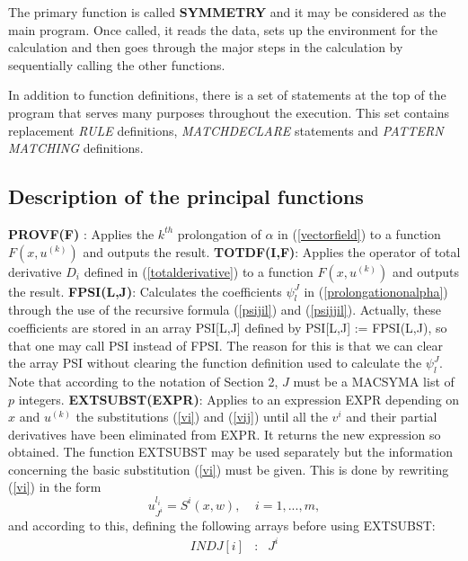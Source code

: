 {\nopagebreak
The primary function is called {\bf SYMMETRY} and it may be considered
as the main program. Once called, it reads the data, sets up the
environment for the calculation and then goes through the major steps
in the calculation by sequentially calling the other functions.

\nopagebreak
In addition to function definitions, there is a set of statements at the
top of the program that serves many purposes throughout the execution.
This set contains replacement {\em RULE} definitions, 
{\em MATCHDECLARE} statements
and {\em PATTERN MATCHING} definitions.

\pagebreak
\subsection{Description of the principal functions}
\vskip 1pt
{\bf PROVF(F) }: Applies the $k^{th}$ prolongation of $\alpha$ in
(\ref{vectorfield}) to a function $F(x, u^{(k)})$ 
and outputs the result. 
\vskip 2pt
\noindent
{\bf TOTDF(I,F)}: Applies the operator of total derivative $D_i$ defined in 
(\ref{totalderivative}) to a function $F(x, u^{(k)}) $ and
outputs the result.
\vskip 2pt
\noindent
{\bf FPSI(L,J)}: Calculates the coefficients $\psi^{J}_{l}$ in 
(\ref{prolongationonalpha})
through the use of the recursive formula (\ref{psijil}) and (\ref{psijjil}).
Actually, these coefficients are stored in an array PSI[L,J] defined by
PSI[L,J] := FPSI(L,J), so that one may call PSI instead of FPSI. 
The reason for this is that we can clear the array PSI without clearing 
the function 
definition used to calculate the $\psi^{J}_{l}$. Note that according to the
notation of Section 2, $J$ must be a MACSYMA list of $p$ integers.
\vskip 2pt
\noindent
{\bf EXTSUBST(EXPR)}: Applies to an expression EXPR depending on $x$ and 
$u^{(k)}$
the substitutions (\ref{vi}) and (\ref{vij})
until all the $v^i$ and their partial derivatives have been eliminated from
EXPR. It returns the new expression so obtained.
The function EXTSUBST may be used separately but the information concerning
the basic substitution (\ref{vi}) must be given. This is done by rewriting
(\ref{vi}) in the form
\begin{equation}
u^{l_{i}}_{{J}^{i}} = S^i (x,w), \;\;\;\; i = 1, ... , m,
\label{si}
\end{equation}
and according to this, defining the following arrays before using EXTSUBST:
\begin{equation}
\left.
\begin{array}{lll}
 INDJ[i] & : & J^i \\

\end{array}
\end{equation}}

